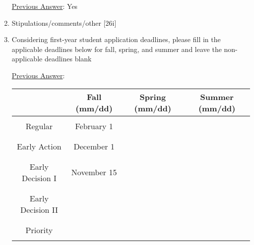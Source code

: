 \documentclass[12 pt, a4paper]{article}
\begin{document}
\begin{Form}
\begin{enumerate}
\underline{Previous Answer}: Yes\medskip

\TextField[width = 6 in,multiline, name=90031]{} \medskip

\item Stipulations/comments/other [26i] \medskip

\TextField[width = 6 in,multiline, name=90032]{} \medskip


\item Considering first-year student application deadlines, please fill in the applicable deadlines below for fall, spring, and summer and leave the non-applicable deadlines blank

\underline{Previous Answer}:

\begin{tabular}{|c|c|c|c|}
\hline
 & Fall (mm/dd) & Spring (mm/dd) & Summer (mm/dd)\\
 \hline
 &&&\\
Regular & February 1 & &\\
&&&\\
\hline
&&&\\
Early Action & December 1 & &\\
&&&\\
\hline
&&&\\
Early Decision I & November 15 && \\
&&&\\
\hline
&&&\\
Early Decision II & &&\\
&&&\\
\hline
&&&\\
Priority & &&\\
&&&\\
\hline
\end{tabular}





\end{enumerate}
\end{Form}
\end{document}
